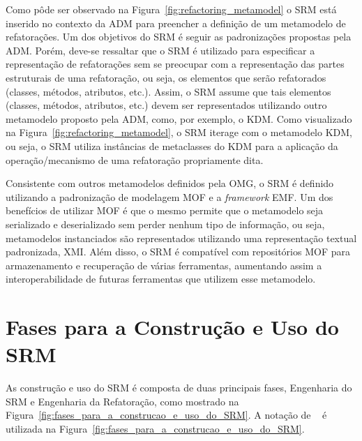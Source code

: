 Como pôde ser observado na Figura~\ref{fig:refactoring_metamodel} o SRM está inserido no contexto da ADM para preencher a definição de um metamodelo de refatorações. Um dos objetivos do SRM é seguir as padronizações propostas pela ADM. Porém, deve-se ressaltar que o SRM é utilizado para especificar a representação de refatorações sem se preocupar com a representação das partes estruturais de uma refatoração, ou seja, os elementos que serão refatorados (classes, métodos, atributos, etc.). Assim, o SRM assume que tais elementos (classes, métodos, atributos, etc.) devem ser representados utilizando outro metamodelo proposto pela ADM, como, por exemplo, o KDM. Como visualizado na Figura~\ref{fig:refactoring_metamodel}, o SRM iterage com o metamodelo KDM, ou seja, o SRM utiliza instâncias de metaclasses do KDM para a aplicação da operação/mecanismo de uma refatoração propriamente dita.

Consistente com outros metamodelos definidos pela OMG, o SRM é definido utilizando a padronização  de modelagem MOF e a \textit{framework} EMF. Um dos benefícios de utilizar MOF é que o mesmo permite que o metamodelo seja serializado e deserializado sem perder nenhum tipo de informação, ou seja, metamodelos instanciados são representados utilizando uma representação textual padronizada, XMI. Além disso, o SRM é compatível com repositórios MOF para armazenamento e recuperação de várias ferramentas, aumentando assim a interoperabilidade de futuras ferramentas que utilizem esse metamodelo.

\section{Fases para a Construção e Uso do SRM}\label{abordagem_para_a_construcao_e_uso_do_SRM}

As construção e uso do SRM é composta de duas principais fases, Engenharia do SRM e Engenharia da Refatoração, como mostrado na Figura~\ref{fig:fases_para_a_construcao_e_uso_do_SRM}. A notação de ~\cite{Marca_1987} é utilizada na Figura~\ref{fig:fases_para_a_construcao_e_uso_do_SRM}.


